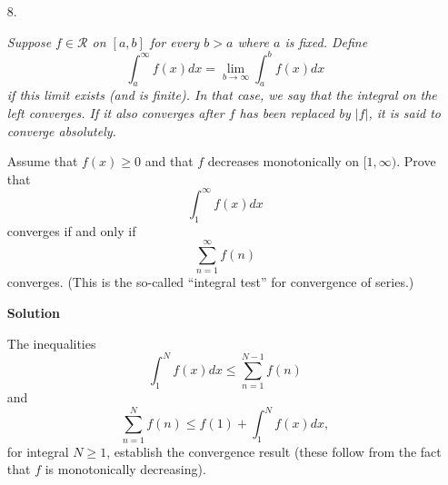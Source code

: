\documentclass{article}
\begin{document}
\begin{enumerate}
\begin{itemize}
{\bf Solution}



\item[8.] {\em Suppose \(f \in \mathcal{R}\) on \([a,b]\) for every \(b > a\) where \(a\) is fixed.  Define
\[\int_a^{\infty} f(x) dx = \lim_{b \to \infty} \int_a^b f(x) dx\]
if this limit exists (and is finite).  In that case, we say that the integral on the left {\em converges}.  If it also converges after \(f\) has been replaced by \(|f|\), it is said to converge {\em absolutely}.

Assume that \(f(x) \geq 0\) and that \(f\) decreases monotonically on \([1,\infty)\).  Prove that
\[\int_1^{\infty} f(x) dx\]
converges if and only if
\[\sum_{n = 1}^{\infty} f(n)\]
converges.  (This is the so-called ``integral test'' for convergence of series.)}

{\bf Solution}

The inequalities
\[\int_1^N f(x) dx \leq \sum_{n = 1}^{N - 1} f(n)\]
and
\[\sum_{n = 1}^N f(n) \leq f(1) + \int_1^N f(x) dx,\]
for integral \(N \geq 1\), establish the convergence result (these follow from the fact that \(f\) is monotonically decreasing).



\end{itemize}



\end{enumerate}
\end{document}
